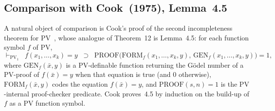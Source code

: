 \documentclass[11pt]{article}
\begin{document}
\subsection{Comparison with Cook~(1975), Lemma~4.5}
\label{subsec:cook}

A natural object of comparison is Cook's proof of the second
incompleteness theorem for $\mathrm{PV}$~\cite{cook1975}, whose
analogue of Theorem~12 is Lemma~4.5: for each function symbol $f$
of $\mathrm{PV}$,
\[
  \vdash_{\mathrm{PV}_1}\;\;
    f(x_1,\dots,x_k) = y \;\;\supset\;\;
    \mathrm{PROOF}\bigl(\mathrm{FORM}_f(x_1,\dots,x_k,y),\,
                        \mathrm{GEN}_f(x_1,\dots,x_k,y)\bigr) = 1,
\]
where $\mathrm{GEN}_f(\bar x, y)$ is a $\mathrm{PV}$-definable function
returning the G\"odel number of a $\mathrm{PV}$-proof of
$f(\bar x) = y$ when that equation is true (and $0$ otherwise),
$\mathrm{FORM}_f(\bar x, y)$ codes the equation
$f(\bar x) = y$, and $\mathrm{PROOF}(s, n) = 1$ is the
$\mathrm{PV}$-internal proof-checker predicate.  Cook proves~4.5 by
induction on the build-up of $f$ as a $\mathrm{PV}$ function symbol.
\end{document}
